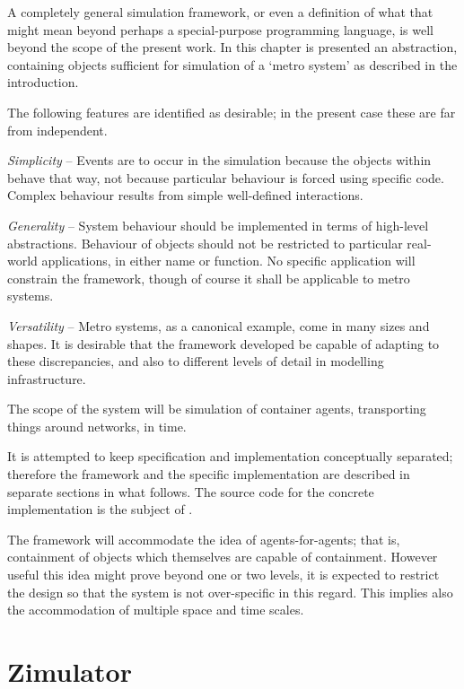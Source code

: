 

A completely general simulation framework, or even a definition of
what that might mean beyond perhaps a special-purpose programming
language, is well beyond the scope of the present work.
In this chapter is presented an abstraction, containing objects
sufficient for simulation of a `metro system' as described in the introduction.

The following features are identified as desirable; in the present case these
are far from independent.

\emph{Simplicity} -- Events are to occur in the simulation because the
objects within behave that way, not because particular behaviour is
forced using specific code.  Complex behaviour results from simple
well-defined interactions.

\emph{Generality} -- System behaviour should be implemented in terms
of high-level abstractions.  Behaviour of objects should not be
restricted to particular real-world applications, in either name or
function. No specific application will constrain the framework, though
of course it shall be applicable to metro systems.

\emph{Versatility} -- Metro systems, as a canonical example, come in
many sizes and shapes.  It is desirable that the framework developed
be capable of adapting to these discrepancies, and also to different
levels of detail in modelling infrastructure.

The scope of the system will be simulation of container agents,
transporting things around networks, in time.

It is attempted to keep specification and implementation conceptually
separated; therefore the framework and the specific implementation are
described in separate sections in what follows. The source code for
the concrete implementation is the subject of .

The framework will accommodate the idea of agents-for-agents; that is,
containment of objects which themselves are capable of
containment. However useful this idea might prove beyond one or two
levels, it is expected to restrict the design so that the system is
not over-specific in this regard. This implies also the accommodation
of multiple space and time scales.

\section{Zimulator}

